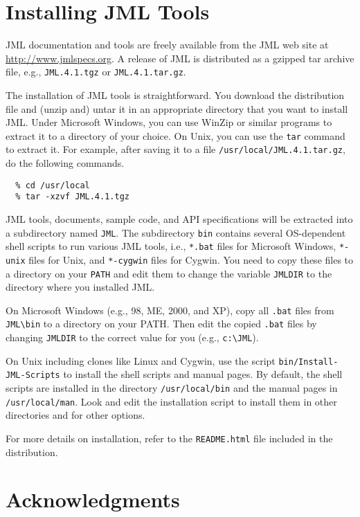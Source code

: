 \documentclass{jotarticle}
\begin{document}
\appendix
\section{Installing JML Tools}
\label{sect-appendix}

JML documentation and tools are freely available from the JML web site
at \url{http://www.jmlspecs.org}. A release of JML is distributed as a
gzipped tar archive file, e.g., \texttt{JML.4.1.tgz} or
\texttt{JML.4.1.tar.gz}.

The installation of JML tools is straightforward. You download the
distribution file and (unzip and) untar it in an appropriate directory
that you want to install JML. Under Microsoft Windows, you can use
WinZip or similar programs to extract it to a directory of your
choice. On Unix, you can use the \texttt{tar} command to extract it.
For example, after saving it to a file
\texttt{/usr/local/JML.4.1.tar.gz}, do the following commands.

\begin{verbatim}
  % cd /usr/local
  % tar -xzvf JML.4.1.tgz
\end{verbatim}

JML tools, documents, sample code, and API specifications will be
extracted into a subdirectory named \texttt{JML}. The subdirectory
\texttt{bin} contains several OS-dependent shell scripts to run
various JML tools, i.e., \texttt{*.bat} files for Microsoft Windows,
\texttt{*-unix} files for Unix, and \texttt{*-cygwin} files for
Cygwin. You need to copy these files to a directory on your
\texttt{PATH} and edit them to change the variable \texttt{JMLDIR} to
the directory where you installed JML.

On Microsoft Windows (e.g., 98, ME, 2000, and XP), copy all
\texttt{.bat} files from \verb|JML\bin| to a directory on your PATH.
Then edit the copied \texttt{.bat} files by changing \texttt{JMLDIR}
to the correct value for you (e.g., \verb|c:\JML|).

On Unix including clones like Linux and Cygwin, use the script
\texttt{bin/Install-JML-Scripts} to install the shell scripts and
manual pages. By default, the shell scripts are installed in the
directory \texttt{/usr/local/bin} and the manual pages in
\texttt{/usr/local/man}. Look and edit the installation script to
install them in other directories and for other options.

For more details on installation, refer to the \texttt{README.html}
file included in the distribution.

\section*{Acknowledgments}
\end{document}
